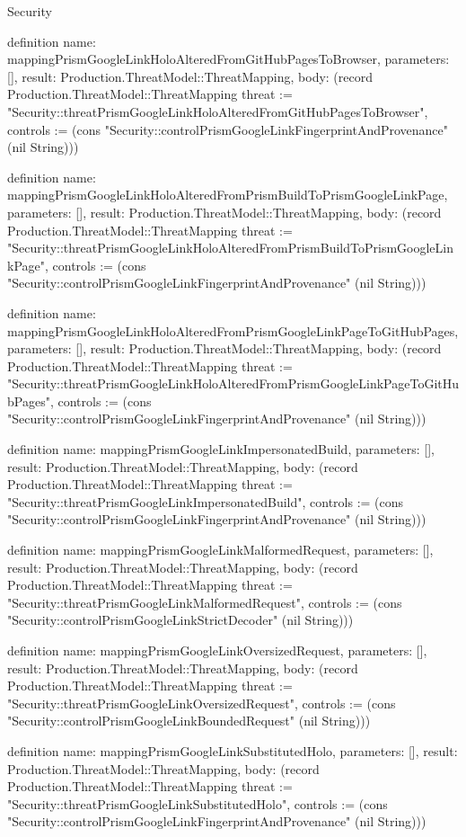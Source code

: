 \begin{lexlean}{Security}
\begin{semanticmodule}
definition{
  name: mappingPrismGoogleLinkHoloAlteredFromGitHubPagesToBrowser,
  parameters: [],
  result: Production.ThreatModel::ThreatMapping,
  body: (record Production.ThreatModel::ThreatMapping {threat := "Security::threatPrismGoogleLinkHoloAlteredFromGitHubPagesToBrowser", controls := (cons "Security::controlPrismGoogleLinkFingerprintAndProvenance" (nil String))})
}

definition{
  name: mappingPrismGoogleLinkHoloAlteredFromPrismBuildToPrismGoogleLinkPage,
  parameters: [],
  result: Production.ThreatModel::ThreatMapping,
  body: (record Production.ThreatModel::ThreatMapping {threat := "Security::threatPrismGoogleLinkHoloAlteredFromPrismBuildToPrismGoogleLinkPage", controls := (cons "Security::controlPrismGoogleLinkFingerprintAndProvenance" (nil String))})
}

definition{
  name: mappingPrismGoogleLinkHoloAlteredFromPrismGoogleLinkPageToGitHubPages,
  parameters: [],
  result: Production.ThreatModel::ThreatMapping,
  body: (record Production.ThreatModel::ThreatMapping {threat := "Security::threatPrismGoogleLinkHoloAlteredFromPrismGoogleLinkPageToGitHubPages", controls := (cons "Security::controlPrismGoogleLinkFingerprintAndProvenance" (nil String))})
}

definition{
  name: mappingPrismGoogleLinkImpersonatedBuild,
  parameters: [],
  result: Production.ThreatModel::ThreatMapping,
  body: (record Production.ThreatModel::ThreatMapping {threat := "Security::threatPrismGoogleLinkImpersonatedBuild", controls := (cons "Security::controlPrismGoogleLinkFingerprintAndProvenance" (nil String))})
}

definition{
  name: mappingPrismGoogleLinkMalformedRequest,
  parameters: [],
  result: Production.ThreatModel::ThreatMapping,
  body: (record Production.ThreatModel::ThreatMapping {threat := "Security::threatPrismGoogleLinkMalformedRequest", controls := (cons "Security::controlPrismGoogleLinkStrictDecoder" (nil String))})
}

definition{
  name: mappingPrismGoogleLinkOversizedRequest,
  parameters: [],
  result: Production.ThreatModel::ThreatMapping,
  body: (record Production.ThreatModel::ThreatMapping {threat := "Security::threatPrismGoogleLinkOversizedRequest", controls := (cons "Security::controlPrismGoogleLinkBoundedRequest" (nil String))})
}

definition{
  name: mappingPrismGoogleLinkSubstitutedHolo,
  parameters: [],
  result: Production.ThreatModel::ThreatMapping,
  body: (record Production.ThreatModel::ThreatMapping {threat := "Security::threatPrismGoogleLinkSubstitutedHolo", controls := (cons "Security::controlPrismGoogleLinkFingerprintAndProvenance" (nil String))})
}


\end{semanticmodule}
\end{lexlean}

